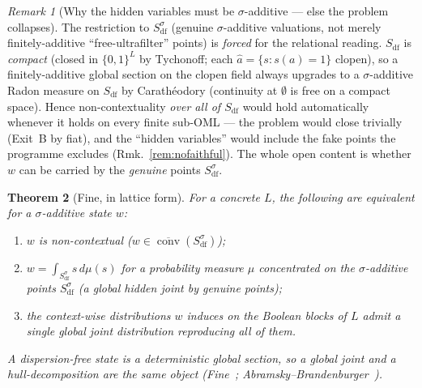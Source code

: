 \documentclass[11pt]{article}
\newtheorem{theorem}{Theorem}[section]
\theoremstyle{definition}
\theoremstyle{remark}
\newtheorem{remark}[theorem]{Remark}
\newcommand{\df}{\mathrm{df}}            %
\newcommand{\conv}{\overline{\operatorname{conv}}}
\begin{document}
\begin{remark}[Why the hidden variables must be $\sigma$-additive --- else the problem collapses]\label{rem:sigmadf}
The restriction to $S_{\df}^{\sigma}$ (genuine $\sigma$-additive valuations, not
merely finitely-additive ``free-ultrafilter'' points) is \emph{forced} for the
relational reading. $S_{\df}$ is \emph{compact} (closed in $\{0,1\}^{L}$ by Tychonoff;
each $\hat a=\{s:s(a)=1\}$ clopen), so a finitely-additive global section on the
clopen field always upgrades to a $\sigma$-additive Radon measure on $S_{\df}$ by
Carath\'eodory (continuity at $\emptyset$ is free on a compact space). Hence
non-contextuality \emph{over all of $S_{\df}$} would hold automatically whenever it
holds on every finite sub-OML --- the problem would close trivially (Exit~B by fiat),
and the ``hidden variables'' would include the fake points the programme excludes
(Rmk.~\ref{rem:nofaithful}). The whole open content is whether $w$ can be carried by
the \emph{genuine} points $S_{\df}^{\sigma}$.
\end{remark}

\begin{theorem}[Fine, in lattice form]\label{thm:fine}
For a concrete $L$, the following are equivalent for a $\sigma$-additive state $w$:
\begin{enumerate}[label=\textup{(\roman*)},nosep]
  \item $w$ is non-contextual ($w\in\conv(S_{\df}^{\sigma})$);
  \item $w=\int_{S_{\df}^{\sigma}} s\,d\mu(s)$ for a probability measure $\mu$
    concentrated on the $\sigma$-additive points $S_{\df}^{\sigma}$
    \textup{(}a \emph{global hidden joint by genuine points}\textup{)};
  \item the context-wise distributions $w$ induces on the Boolean blocks of $L$
    admit a single global joint distribution reproducing all of them.
\end{enumerate}
A dispersion-free state \emph{is} a deterministic global section, so a global joint
and a hull-decomposition are the same object (Fine~\cite{Fine1982};
Abramsky--Brandenburger~\cite{AbramskyBrandenburger2011}).
\end{theorem}
\end{document}
